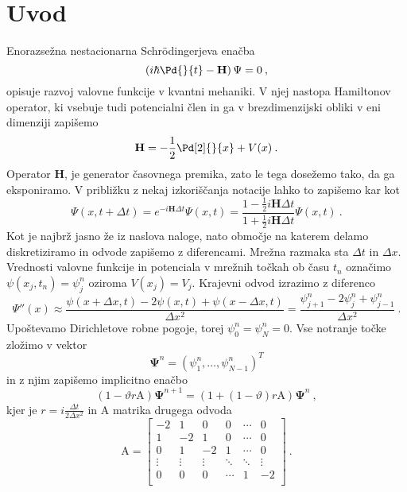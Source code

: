 \documentclass{porocilo}
\begin{document}
\maketitle
\section{Uvod}
Enorazsežna nestacionarna Schr{\" o}dingerjeva enačba
\begin{equation*}
    \left( i \hbar \Pd{}{t} - \mathbf{H} \right) \Psi = 0 \>,
\end{equation*}
opisuje razvoj valovne funkcije v kvantni mehaniki. V njej nastopa Hamiltonov operator, ki vsebuje tudi potencialni člen in ga v brezdimenzijski obliki v eni dimenziji zapišemo
\begin{equation*}
    \mathbf{H} = -\frac{1}{2} \Pd[2]{}{x} + V(x) \>.
\end{equation*}
Operator $\mathbf{H}$, je generator časovnega premika, zato le tega dosežemo tako, da ga eksponiramo. V približku z nekaj izkoriščanja notacije lahko to zapišemo kar kot
\begin{equation*}
    \Psi(x, t+ \Delta t) = e^{- i \mathbf{H} \Delta t} \Psi(x, t) = \frac{1 - \tfrac{1}{2}i\mathbf{H} \Delta t}{1 + \tfrac{1}{2} i\mathbf{H} \Delta t} \Psi(x, t) \>.
\end{equation*}
Kot je najbrž jasno že iz naslova naloge, nato območje na katerem delamo diskretiziramo in odvode zapišemo z diferencami. Mrežna razmaka sta $\Delta t$ in $\Delta x$. Vrednosti valovne funkcije in potenciala v mrežnih točkah ob času $t_n$ označimo $\psi(x_j,t_n)=\psi_j^n$ oziroma $V(x_j)=V_j$. Krajevni odvod izrazimo z diferenco
\begin{equation*}
    \Psi''(x)\approx \frac{\psi(x+\Delta x,t)-2\psi(x,t)+\psi(x-\Delta x,t)}{\Delta x^2}=\frac{\psi_{j+1}^n - 2\psi_j^n+\psi_{j-1}^n}{\Delta x^2}\>.
\end{equation*}
Upoštevamo Dirichletove robne pogoje, torej $\psi_0^n = \psi_N^n = 0$. Vse notranje točke zložimo v vektor
\begin{equation*}
    \boldsymbol{\Psi}^n = {(\psi_1^n,\ldots,\psi_{N-1}^n)}^T
\end{equation*}
in z njim zapišemo implicitno enačbo
\begin{equation}
    (1 - \vartheta r \text{A}) \boldsymbol{\Psi}^{n+1} = (1 + (1-\vartheta) r \text{A}) \boldsymbol{\Psi}^n \>,
\end{equation}
kjer je $r = i \frac{\Delta t}{2 \Delta x^2}$ in $\text{A}$ matrika drugega odvoda
\begin{equation*}
    \text{A} = \begin{bmatrix}
        -2     & 1      & 0      & 0      & \cdots & 0      \\
        1      & -2     & 1      & 0      & \cdots & 0      \\
        0      & 1      & -2     & 1      & \cdots & 0      \\
        \vdots & \vdots & \vdots & \ddots & \ddots & \vdots \\
        0      & 0      & 0      & \cdots & 1      & -2     \\
    \end{bmatrix} \>.
\end{equation*}
\end{document}
